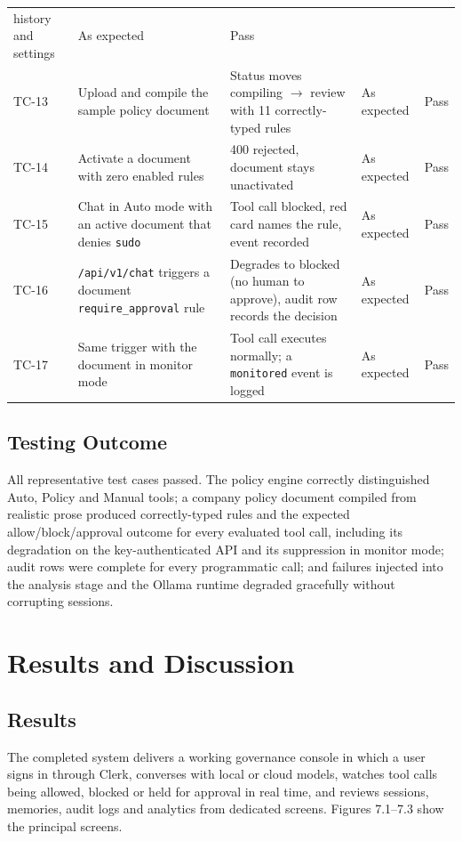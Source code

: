 \documentclass[12pt,a4paper,oneside]{report}
\begin{document}
\begin{table}[!t]
\begin{singlespace}
\begin{tabular}{p{1.1cm}p{4.1cm}p{4.0cm}p{2.5cm}p{1.2cm}}
history and settings & As expected & Pass \\
TC-13 & Upload and compile the sample policy document & Status moves
compiling $\rightarrow$ review with 11 correctly-typed rules & As
expected & Pass \\
TC-14 & Activate a document with zero enabled rules & 400 rejected,
document stays unactivated & As expected & Pass \\
TC-15 & Chat in Auto mode with an active document that denies
\texttt{sudo} & Tool call blocked, red card names the rule, event
recorded & As expected & Pass \\
TC-16 & \texttt{/api/v1/chat} triggers a document
\texttt{require\_approval} rule & Degrades to blocked (no human to
approve), audit row records the decision & As expected & Pass \\
TC-17 & Same trigger with the document in monitor mode & Tool call
executes normally; a \texttt{monitored} event is logged & As expected
& Pass \\
\bottomrule
\end{tabular}
\end{singlespace}
\end{table}

\section{Testing Outcome}
All representative test cases passed. The policy engine correctly
distinguished Auto, Policy and Manual tools; a company policy document
compiled from realistic prose produced correctly-typed rules and the
expected allow/block/approval outcome for every evaluated tool call,
including its degradation on the key-authenticated API and its
suppression in monitor mode; audit rows were complete for every
programmatic call; and failures injected into the analysis stage and
the Ollama runtime degraded gracefully without corrupting sessions.

\chapter{Results and Discussion}

\section{Results}
The completed system delivers a working governance console in which a
user signs in through Clerk, converses with local or cloud models,
watches tool calls being allowed, blocked or held for approval in real
time, and reviews sessions, memories, audit logs and analytics from
dedicated screens. Figures 7.1--7.3 show the principal screens.
\end{document}
